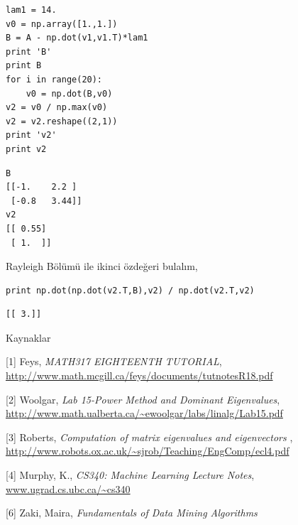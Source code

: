 \documentclass[12pt,fleqn]{article}\usepackage{../../common}
\begin{document}
\begin{verbatim}
lam1 = 14.
v0 = np.array([1.,1.])
B = A - np.dot(v1,v1.T)*lam1
print 'B'
print B
for i in range(20): 
    v0 = np.dot(B,v0)
v2 = v0 / np.max(v0)
v2 = v2.reshape((2,1))
print 'v2'
print v2
\end{verbatim}

\begin{verbatim}
B
[[-1.    2.2 ]
 [-0.8   3.44]]
v2
[[ 0.55]
 [ 1.  ]]
\end{verbatim}

Rayleigh Bölümü ile ikinci özdeğeri bulalım,

\begin{verbatim}
print np.dot(np.dot(v2.T,B),v2) / np.dot(v2.T,v2)
\end{verbatim}

\begin{verbatim}
[[ 3.]]
\end{verbatim}


Kaynaklar

[1] Feys, {\em MATH317 EIGHTEENTH TUTORIAL}, \url{http://www.math.mcgill.ca/feys/documents/tutnotesR18.pdf}

[2] Woolgar, {\em Lab 15-Power Method and Dominant Eigenvalues}, \url{http://www.math.ualberta.ca/~ewoolgar/labs/linalg/Lab15.pdf}

[3] Roberts, {\em Computation of matrix eigenvalues and eigenvectors }, \url{http://www.robots.ox.ac.uk/~sjrob/Teaching/EngComp/ecl4.pdf}

[4] Murphy, K., {\em CS340: Machine Learning Lecture Notes}, \url{www.ugrad.cs.ubc.ca/~cs340}

[6] Zaki, Maira, {\em Fundamentals of Data Mining Algorithms}
\end{document}

